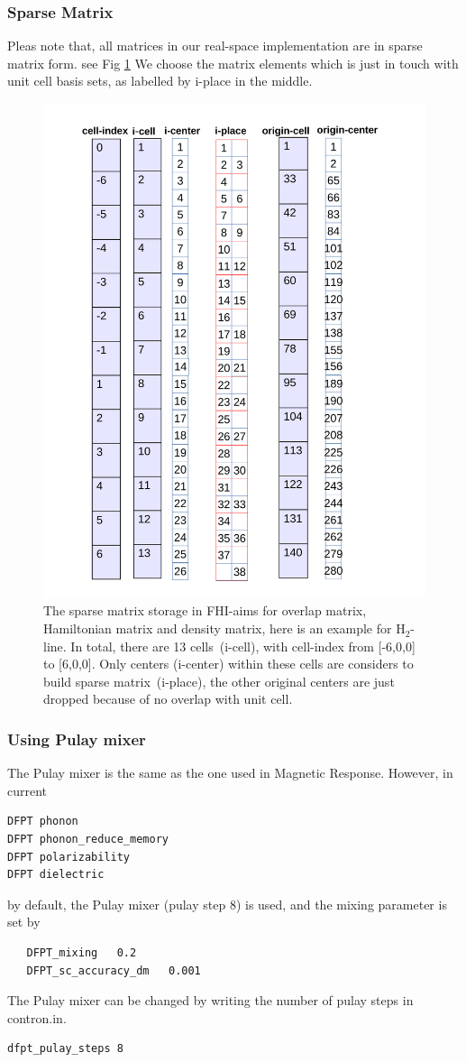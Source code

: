 {\subsubsection{Sparse Matrix}
Pleas note that, all matrices in our real-space implementation are in
sparse matrix form. see Fig \ref{fig:PBC_in_FHI-aims}
We choose the matrix elements which is just in touch 
with unit cell basis sets, as labelled by i-place in the middle.

\begin{figure}
\caption{The sparse matrix storage in FHI-aims for overlap matrix, Hamiltonian matrix and density matrix, here is an example for H$_2$-line. In total, there are 13 cells~(i-cell), with cell-index from [-6,0,0] to [6,0,0]. Only centers (i-center) within these cells are considers to build sparse matrix~(i-place), the other original centers are just dropped because of no overlap with unit cell.}
\label{fig:PBC_in_FHI-aims}
\includegraphics[width=0.7\columnwidth]{PBC_in_FHI-aims.pdf}
\end{figure}

\subsubsection{Using Pulay mixer}
The Pulay mixer is the same as the one used in Magnetic Response. However, in current 
\begin{verbatim} 
DFPT phonon
DFPT phonon_reduce_memory
DFPT polarizability
DFPT dielectric
\end{verbatim}
by default, the Pulay mixer (pulay step 8) is used, and the mixing parameter is set by 
\begin{verbatim}  
   DFPT_mixing   0.2
   DFPT_sc_accuracy_dm   0.001
\end{verbatim}
The Pulay mixer can be changed by writing the number of pulay steps in contron.in. 
\begin{verbatim} 
dfpt_pulay_steps 8
\end{verbatim}

}
